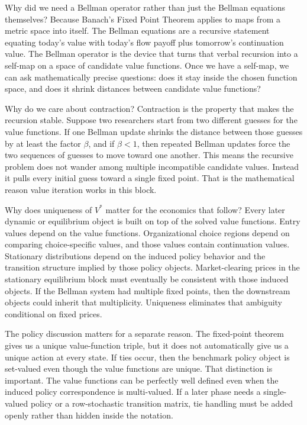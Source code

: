 Why did we need a Bellman operator rather than just the Bellman equations themselves? Because Banach's Fixed Point Theorem applies to maps from a metric space into itself. The Bellman equations are a recursive statement equating today's value with today's flow payoff plus tomorrow's continuation value. The Bellman operator is the device that turns that verbal recursion into a self-map on a space of candidate value functions. Once we have a self-map, we can ask mathematically precise questions: does it stay inside the chosen function space, and does it shrink distances between candidate value functions?

Why do we care about contraction? Contraction is the property that makes the recursion stable. Suppose two researchers start from two different guesses for the value functions. If one Bellman update shrinks the distance between those guesses by at least the factor $\beta$, and if $\beta<1$, then repeated Bellman updates force the two sequences of guesses to move toward one another. This means the recursive problem does not wander among multiple incompatible candidate values. Instead it pulls every initial guess toward a single fixed point. That is the mathematical reason value iteration works in this block.

Why does uniqueness of $V^*$ matter for the economics that follow? Every later dynamic or equilibrium object is built on top of the solved value functions. Entry values depend on the value functions. Organizational choice regions depend on comparing choice-specific values, and those values contain continuation values. Stationary distributions depend on the induced policy behavior and the transition structure implied by those policy objects. Market-clearing prices in the stationary equilibrium block must eventually be consistent with those induced objects. If the Bellman system had multiple fixed points, then the downstream objects could inherit that multiplicity. Uniqueness eliminates that ambiguity conditional on fixed prices.

The policy discussion matters for a separate reason. The fixed-point theorem gives us a unique value-function triple, but it does not automatically give us a unique action at every state. If ties occur, then the benchmark policy object is set-valued even though the value functions are unique. That distinction is important. The value functions can be perfectly well defined even when the induced policy correspondence is multi-valued. If a later phase needs a single-valued policy or a row-stochastic transition matrix, tie handling must be added openly rather than hidden inside the notation.

